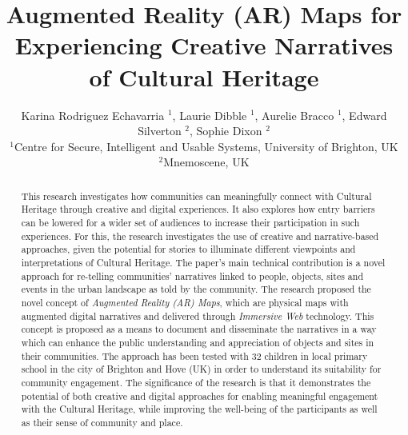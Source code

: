 \documentclass{egpubl}
\title[Augmented Reality (AR) Maps]%
{Augmented Reality (AR) Maps for
Experiencing Creative Narratives of Cultural Heritage}
\author[K. Rodriguez Echavarria, L. Dibble, A. Bracco, E. Silverton, S. Dixon]
{\parbox{\textwidth}{ \centering Karina Rodriguez Echavarria $^1$, Laurie
Dibble $^1$, Aurelie Bracco $^1$, Edward Silverton $^2$, Sophie Dixon $^2$
\\ $^1$Centre for Secure, Intelligent and Usable Systems, University of
Brighton, UK\\ $^2$Mnemoscene, UK\\ }}
\begin{document}

\maketitle
\begin{abstract} This research investigates how communities can
meaningfully connect with Cultural Heritage through creative and digital
experiences. It also explores how entry barriers can be lowered for
a wider set of audiences to increase their participation in such experiences.
For this, the research investigates the use of creative and narrative-based
approaches, given the potential for stories to illuminate different viewpoints
and interpretations of Cultural Heritage. The paper's main technical
contribution is a novel approach for re-telling communities' narratives
linked to people, objects, sites and events in the urban landscape as told by
the community. The research proposed the novel concept of \emph{Augmented
Reality (AR) Maps}, which are physical maps with augmented digital narratives
and delivered through \emph{Immersive Web} technology. This concept is
proposed as a means to document and disseminate the narratives in a way which
can enhance the public understanding and appreciation of objects and sites in
their communities. The approach has been tested with 32 children in local
primary school in the city of Brighton and Hove (UK) in order to understand its suitability
for community engagement. The significance of the research is that it
demonstrates the potential of both creative and digital approaches for
enabling meaningful engagement with the Cultural Heritage, while improving the
well-being of the participants as well as their sense of community and place.


\end{abstract}
\end{document}
